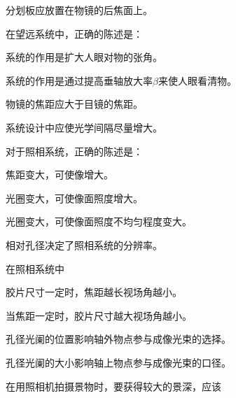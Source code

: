 \documentclass[standard, analysis, notocnum]{ExBook}
\newcommand{\answerarea}[1][8cm]{%
  \par\vspace{2mm}%
  \noindent{\color{themeColor!35}\rule{\linewidth}{0.4pt}}\par
  \noindent\begin{minipage}[t][#1][t]{\linewidth}\vspace{0pt}\end{minipage}\par
  \noindent{\color{themeColor!35}\rule{\linewidth}{0.4pt}}\par
}
\begin{document}
\begin{qitems}
\begin{bbox}
\par\noindent\hspace{2em}分划板应放置在物镜的后焦面上。
\answerarea[3.5cm]
\end{bbox}
\begin{bbox}
\qitem 在望远系统中，正确的陈述是：
\par\noindent\hspace{2em}系统的作用是扩大人眼对物的张角。
\par\noindent\hspace{2em}系统的作用是通过提高垂轴放大率$\beta$来使人眼看清物。
\par\noindent\hspace{2em}物镜的焦距应大于目镜的焦距。
\par\noindent\hspace{2em}系统设计中应使光学间隔尽量增大。
\answerarea[3.5cm]
\end{bbox}
\begin{bbox}
\qitem 对于照相系统，正确的陈述是：
\par\noindent\hspace{2em}焦距变大，可使像增大。
\par\noindent\hspace{2em}光圈变大，可使像面照度增大。
\par\noindent\hspace{2em}光圈变大，可使像面照度不均匀程度变大。
\par\noindent\hspace{2em}相对孔径决定了照相系统的分辨率。
\answerarea[3.5cm]
\end{bbox}
\begin{bbox}
\qitem 在照相系统中
\par\noindent\hspace{2em}胶片尺寸一定时，焦距越长视场角越小。
\par\noindent\hspace{2em}当焦距一定时，胶片尺寸越大视场角越小。
\par\noindent\hspace{2em}孔径光阑的位置影响轴外物点参与成像光束的选择。
\par\noindent\hspace{2em}孔径光阑的大小影响轴上物点参与成像光束的口径。
\answerarea[3.5cm]
\end{bbox}
\begin{bbox}
\qitem 在用照相机拍摄景物时，要获得较大的景深，应该

\end{bbox}
\end{qitems}
\end{document}
